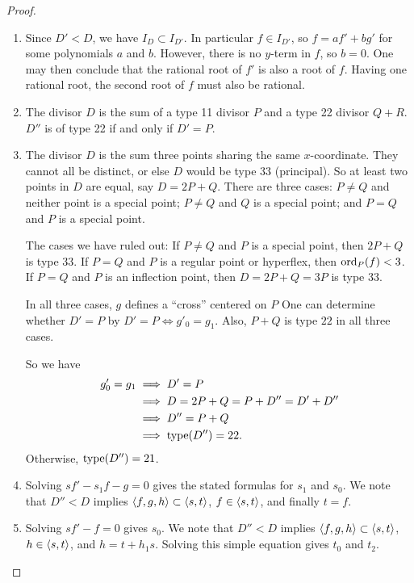 \begin{proof}
  \begin{enumerate}[label=(\roman*)]
    \item
      Since $D' < D$, we have $I_D \subset I_{D'}$.
      In particular $f \in I_{D'}$, so $f = af'+ bg'$ for some polynomials $a$ and $b$.
      However, there is no $y$-term in $f$, so $b = 0$.
      One may then conclude that the rational root of $f'$ is also a root of $f$.
      Having one rational root, the second root of $f$ must also be rational.
    
    \item
      The divisor $D$ is the sum of a type 11 divisor $P$ and a type 22 divisor $Q + R$.
      $D''$ is of type 22 if and only if $D' = P$.
    
    \item
      The divisor $D$ is the sum three points sharing the same $x$-coordinate.
      They cannot all be distinct, or else $D$ would be type 33 (principal).
      So at least two points in $D$ are equal, say $D = 2P + Q$.
      There are three cases:
      $P \neq Q$ and neither point is a special point;
      $P \neq Q$ and $Q$ is a special point;
      and $P = Q$ and $P$ is a special point.
      
      The cases we have ruled out:
      If $P \neq Q$ and $P$ is a special point, then $2P + Q$ is type 33.
      If $P = Q$ and $P$ is a regular point or hyperflex, then $\operatorname{ord}_P(f) < 3$.
      If $P = Q$ and $P$ is an inflection point, then $D = 2P + Q = 3P$ is type 33.
      
      In all three cases, $g$ defines a ``cross'' centered on $P$
      One can determine whether $D' = P$ by $D' = P \iff g'_0 = g_1$.
      Also, $P + Q$ is type $22$ in all three cases.
      
      So we have
      \begin{align*}
        g'_0 = g_1
          &\implies D' = P \\
          &\implies D = 2P + Q = P + D'' = D' + D'' \\
          &\implies D'' = P + Q \\
          &\implies \operatorname{type}(D'') = 22.
      \end{align*}
      Otherwise, $\operatorname{type}(D'') = 21$.
    
    \item
      Solving $sf' - s_1f - g = 0$ gives the stated formulas for $s_1$ and $s_0$.
      We note that $D'' < D$ implies $\left\langle f,g,h \right\rangle \subset \left\langle s,t \right\rangle$,
      $f \in \left\langle s,t \right\rangle$, and finally $t = f$.
    
    \item
      Solving $sf' - f = 0$ gives $s_0$.
      We note that $D'' < D$ implies $\left\langle f,g,h \right\rangle \subset \left\langle s,t \right\rangle$,
      $h \in \left\langle s,t \right\rangle$, and $h = t + h_1s$.
      Solving this simple equation gives $t_0$ and $t_2$.
  \end{enumerate}
\end{proof}



